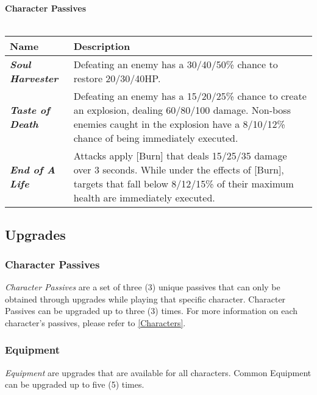 \documentclass[10pt, a4paper]{article}
\begin{document}
  	\noindent\textbf{Character Passives}\\\\
  	\begin{supertabular}{p{2.7cm} p{6cm}}
  		\hline
  		\textbf{Name}                    & \textbf{Description}                                                                                                                                                                           \\ \hline
  		\textit{\textbf{Soul Harvester}} & Defeating an enemy has a 30/40/50\% chance to restore 20/30/40HP.                                                                                                                              \\
  		\textit{\textbf{Taste of Death}} & Defeating an enemy has a 15/20/25\% chance to create an explosion, dealing 60/80/100 damage. Non-boss enemies caught in the explosion have a 8/10/12\% chance of being immediately executed.   \\
  		\textit{\textbf{End of A Life}}  & Attacks apply {[}Burn{]} that deals 15/25/35 damage over 3 seconds. While under the effects of {[}Burn{]}, targets that fall below 8/12/15\% of their maximum health are immediately executed. \\ \hline
  	\end{supertabular}
  	\subsection{Upgrades} \label{Upgrades}
  	
  	\subsubsection{Character Passives}
  	
  	\textit{Character Passives} are a set of three (3) unique passives that can only be obtained through upgrades while playing that specific character. Character Passives can be upgraded up to three (3) times. For more information on each character's passives, please refer to \ref{Characters}.
  	
  	\subsubsection{Equipment}
  	
  	\textit{Equipment} are upgrades that are available for all characters. Common Equipment can be upgraded up to five (5) times.
  	
\end{document}
